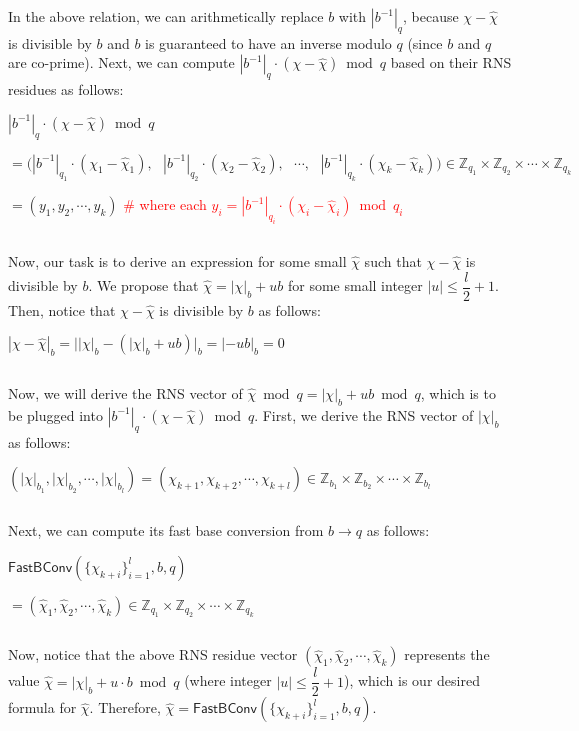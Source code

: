 $ $

In the above relation, we can arithmetically replace $b$ with $|b^{-1}|_q$, because $\chi - \hat{\chi}$ is divisible by $b$ and $b$ is guaranteed to have an inverse modulo $q$ (since $b$ and $q$ are co-prime). Next, we can compute  $|b^{-1}|_{q}\cdot (\chi - \hat{\chi}) \bmod q$ based on their RNS residues as follows:

$|b^{-1}|_q\cdot (\chi - \hat{\chi}) \bmod q$

$= \bm(|b^{-1}|_{q_1} \cdot (\chi_1 - \hat\chi_1), \text{ } |b^{-1}|_{q_2} \cdot (\chi_2 - \hat\chi_2), \text{ } \cdots, \text{ } |b^{-1}|_{q_k} \cdot (\chi_k - \hat\chi_k)\bm) \in \mathbb{Z}_{q_1} \times \mathbb{Z}_{q_2} \times \cdots \times \mathbb{Z}_{q_k} $

$= (y_1, y_2, \cdots, y_k) $ \textcolor{red}{ \# where each $y_i = |b^{-1}|_{q_i} \cdot (\chi_i - \hat\chi_i) \bmod q_i$}

$ $

Now, our task is to derive an expression for some small $\hat\chi$ such that $\chi - \hat\chi$ is divisible by $b$. We propose that $\hat\chi = |\chi|_b + ub$ for some small integer $|u| \leq \dfrac{l}{2}+1$. Then, notice that $\chi - \hat\chi$ is divisible by $b$ as follows:

$|\chi - \hat\chi|_b = \Big||\chi|_b - (|\chi|_b + ub)\Big|_b = |-ub|_b = 0$


$ $

Now, we will derive the RNS vector of $\hat\chi \bmod q = |\chi|_b + ub \bmod q$, which is to be plugged into $|b^{-1}|_q\cdot (\chi - \hat{\chi}) \bmod q$. First, we derive the RNS vector of $|\chi|_{b}$ as follows: 

$(|\chi|_{b_1}, |\chi|_{b_2}, \cdots, |\chi|_{b_l}) = (\chi_{k+1}, \chi_{k+2}, \cdots, \chi_{k+l}) \in \mathbb{Z}_{b_1} \times \mathbb{Z}_{b_2} \times \cdots \times \mathbb{Z}_{b_l}$



$ $

Next, we can compute its fast base conversion from $b \rightarrow q$ as follows:

$\textsf{FastBConv}(\{\chi_{k+i}\}_{i=1}^{l}, b, q)$

$= (\hat\chi_1, \hat\chi_2, \cdots, \hat\chi_{k}) \in \mathbb{Z}_{q_1} \times \mathbb{Z}_{q_2} \times \cdots \times \mathbb{Z}_{q_k}$

$ $ 

Now, notice that the above RNS residue vector $(\hat\chi_1, \hat\chi_2, \cdots, \hat\chi_k)$ represents the value $\hat\chi = |\chi|_b + u \cdot b \bmod q$ (where integer $|u| \leq \dfrac{l}{2}+1$), which is our desired formula for $\hat\chi$. Therefore, $\hat\chi = \textsf{FastBConv}(\{\chi_{k+i}\}_{i=1}^{l}, b, q)$.

